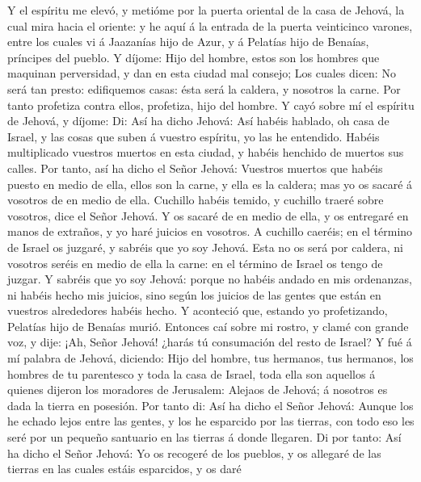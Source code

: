  Y el espíritu me elevó, y metióme por la puerta oriental
de la casa de Jehová, la cual mira hacia el oriente: y he aquí á la
entrada de la puerta veinticinco varones, entre los cuales vi á
Jaazanías hijo de Azur, y á Pelatías hijo de Benaías, príncipes del
pueblo.  Y díjome: Hijo del hombre, estos son los hombres
que maquinan perversidad, y dan en esta ciudad mal consejo;
 Los cuales dicen: No será tan presto: edifiquemos casas:
ésta será la caldera, y nosotros la carne.  Por tanto
profetiza contra ellos, profetiza, hijo del hombre.  Y
cayó sobre mí el espíritu de Jehová, y díjome: Di: Así ha dicho Jehová:
Así habéis hablado, oh casa de Israel, y las cosas que suben á vuestro
espíritu, yo las he entendido.  Habéis multiplicado
vuestros muertos en esta ciudad, y habéis henchido de muertos sus
calles.  Por tanto, así ha dicho el Señor Jehová: Vuestros
muertos que habéis puesto en medio de ella, ellos son la carne, y ella
es la caldera; mas yo os sacaré á vosotros de en medio de ella.
 Cuchillo habéis temido, y cuchillo traeré sobre vosotros,
dice el Señor Jehová.  Y os sacaré de en medio de ella, y
os entregaré en manos de extraños, y yo haré juicios en vosotros.
 A cuchillo caeréis; en el término de Israel os juzgaré,
y sabréis que yo soy Jehová.  Esta no os será por
caldera, ni vosotros seréis en medio de ella la carne: en el término de
Israel os tengo de juzgar.  Y sabréis que yo soy Jehová:
porque no habéis andado en mis ordenanzas, ni habéis hecho mis juicios,
sino según los juicios de las gentes que están en vuestros alrededores
habéis hecho.  Y aconteció que, estando yo profetizando,
Pelatías hijo de Benaías murió. Entonces caí sobre mi rostro, y clamé
con grande voz, y dije: ¡Ah, Señor Jehová! ¿harás tú consumación del
resto de Israel?  Y fué á mí palabra de Jehová, diciendo:
 Hijo del hombre, tus hermanos, tus hermanos, los hombres
de tu parentesco y toda la casa de Israel, toda ella son aquellos á
quienes dijeron los moradores de Jerusalem: Alejaos de Jehová; á
nosotros es dada la tierra en posesión.  Por tanto di:
Así ha dicho el Señor Jehová: Aunque los he echado lejos entre las
gentes, y los he esparcido por las tierras, con todo eso les seré por un
pequeño santuario en las tierras á donde llegaren.  Di
por tanto: Así ha dicho el Señor Jehová: Yo os recogeré de los pueblos,
y os allegaré de las tierras en las cuales estáis esparcidos, y os daré
